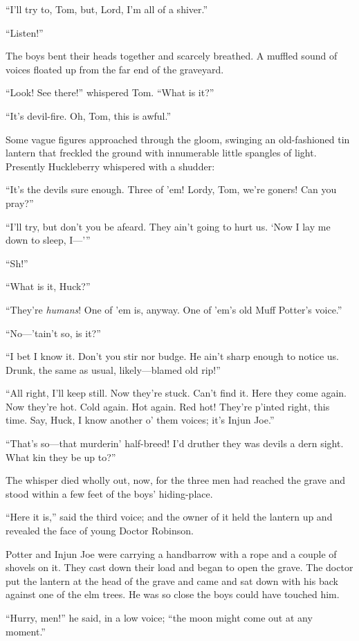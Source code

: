 \documentclass{book}
\begin{document}
“I’ll try to, Tom, but, Lord, I’m all of a shiver.”

“Listen!”

The boys bent their heads together and scarcely breathed. A muffled sound of voices floated up from the far end of the graveyard.

“Look! See there!” whispered Tom. “What is it?”

“It’s devil-fire. Oh, Tom, this is awful.”

Some vague figures approached through the gloom, swinging an old-fashioned tin lantern that freckled the ground with innumerable little spangles of light. Presently Huckleberry whispered with a shudder:

“It’s the devils sure enough. Three of ’em! Lordy, Tom, we’re goners! Can you pray?”

“I’ll try, but don’t you be afeard. They ain’t going to hurt us. ‘Now I lay me down to sleep, I—’”

“Sh!”

“What is it, Huck?”

“They’re \emph{humans}! One of ’em is, anyway. One of ’em’s old Muff Potter’s voice.”

“No—’tain’t so, is it?”

“I bet I know it. Don’t you stir nor budge. He ain’t sharp enough to notice us. Drunk, the same as usual, likely—blamed old rip!”

“All right, I’ll keep still. Now they’re stuck. Can’t find it. Here they come again. Now they’re hot. Cold again. Hot again. Red hot! They’re p’inted right, this time. Say, Huck, I know another o’ them voices; it’s Injun Joe.”

“That’s so—that murderin’ half-breed! I’d druther they was devils a dern sight. What kin they be up to?”

The whisper died wholly out, now, for the three men had reached the grave and stood within a few feet of the boys’ hiding-place.

“Here it is,” said the third voice; and the owner of it held the lantern up and revealed the face of young Doctor Robinson.

Potter and Injun Joe were carrying a handbarrow with a rope and a couple of shovels on it. They cast down their load and began to open the grave. The doctor put the lantern at the head of the grave and came and sat down with his back against one of the elm trees. He was so close the boys could have touched him.

“Hurry, men!” he said, in a low voice; “the moon might come out at any moment.”
\end{document}

